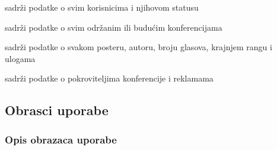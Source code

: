 \begin{packed_enum}
				\begin{packed_enum}
					
					\item sadrži podatke o svim korisnicima i njihovom statusu
					\item sadrži podatke o svim održanim ili budućim konferencijama
					\item sadrži podatke o svakom posteru, autoru, broju glasova, krajnjem rangu i ulogama
					\item sadrži podatke o pokroviteljima konferencije i reklamama
					
				\end{packed_enum}
			\end{packed_enum}
			
			\eject 
			
			
				
			\subsection{Obrasci uporabe}
				
				\subsubsection{Opis obrazaca uporabe}
					
